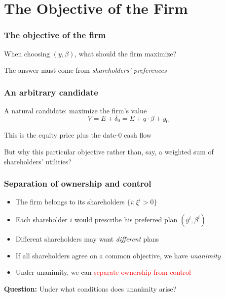 \documentclass[blue]{beamer}
\theoremstyle{definition}
\theoremstyle{example}
\begin{document}
\section{The Objective of the Firm}

\begin{frame}\frametitle{The objective of the firm}
\begin{center}
\Large \alert{When choosing $(y, \beta)$, what should the firm maximize?}
\end{center}
\bigskip
\bigskip

The answer must come from \emph{shareholders' preferences}
\end{frame}

\begin{frame}\frametitle{An arbitrary candidate}
A natural candidate: maximize the firm's value
\begin{equation*}
V = E + \delta_0 = E + q \cdot \beta + y_0
\end{equation*}
\bigskip

This is the equity price plus the date-0 cash flow
\bigskip

But why this particular objective rather than, say, a weighted sum of shareholders' utilities?
\end{frame}

\begin{frame}\frametitle{Separation of ownership and control}
\begin{itemize}
\item The firm belongs to its shareholders $\{i \colon \xi^i > 0\}$
\item Each shareholder $i$ would prescribe his preferred plan $(y^i, \beta^i)$
\item Different shareholders may want \emph{different} plans
\bigskip
\item If all shareholders agree on a common objective, we have \emph{unanimity}
\item Under unanimity, we can \textcolor{red}{separate ownership from control}
\end{itemize}
\bigskip

\textbf{Question:} Under what conditions does unanimity arise?
\end{frame}
\end{document}
